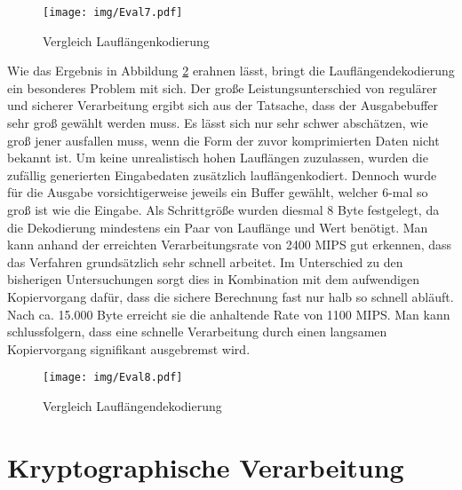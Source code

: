 \begin{figure}[h]
	\texttt{[image: img/Eval7.pdf]}
	\centering
	\caption{Vergleich Lauflängenkodierung}
	\label{fig:eval7}
\end{figure}

Wie das Ergebnis in Abbildung \ref{fig:eval8} erahnen lässt, bringt die Lauflängendekodierung ein besonderes Problem mit sich. Der große Leistungsunterschied von regulärer und sicherer Verarbeitung ergibt sich aus der Tatsache, dass der Ausgabebuffer sehr groß gewählt werden muss. Es lässt sich nur sehr schwer abschätzen, wie groß jener ausfallen muss, wenn die Form der zuvor komprimierten Daten nicht bekannt ist. Um keine unrealistisch hohen Lauflängen zuzulassen, wurden die zufällig generierten Eingabedaten zusätzlich lauflängenkodiert. Dennoch wurde für die Ausgabe vorsichtigerweise jeweils ein Buffer gewählt, welcher 6-mal so groß ist wie die Eingabe. Als Schrittgröße wurden diesmal 8 Byte festgelegt, da die Dekodierung mindestens ein Paar von Lauflänge und Wert benötigt. Man kann anhand der erreichten Verarbeitungsrate von 2400 \ac{MIPS} gut erkennen, dass das Verfahren grundsätzlich sehr schnell arbeitet. Im Unterschied zu den bisherigen Untersuchungen sorgt dies in Kombination mit dem aufwendigen Kopiervorgang dafür, dass die sichere Berechnung fast nur halb so schnell abläuft. Nach ca. 15.000 Byte erreicht sie die anhaltende Rate von 1100 \ac{MIPS}. Man kann schlussfolgern, dass eine schnelle Verarbeitung durch einen langsamen Kopiervorgang signifikant ausgebremst wird.

\begin{figure}[h]
	\texttt{[image: img/Eval8.pdf]}
	\centering
	\caption{Vergleich Lauflängendekodierung}
	\label{fig:eval8}
\end{figure}

\section{Kryptographische Verarbeitung}

